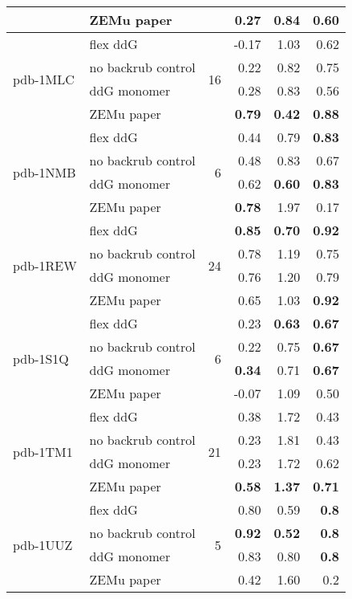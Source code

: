 \begin{longtable}{llrrrr}
 & ZEMu paper & & 0.27 & 0.84 & 0.60  \\
\hline
 \multirow{ 4}{*}{pdb-1MLC} & flex ddG & \multirow{ 4}{*}{16} & -0.17 & 1.03 & 0.62  \\
 & no backrub control & & 0.22 & 0.82 & 0.75  \\
 & ddG monomer & & 0.28 & 0.83 & 0.56  \\
 & ZEMu paper & & \textbf{0.79} & \textbf{0.42} & \textbf{0.88}  \\
\hline
 \multirow{ 4}{*}{pdb-1NMB} & flex ddG & \multirow{ 4}{*}{6} & 0.44 & 0.79 & \textbf{0.83}  \\
 & no backrub control & & 0.48 & 0.83 & 0.67  \\
 & ddG monomer & & 0.62 & \textbf{0.60} & \textbf{0.83}  \\
 & ZEMu paper & & \textbf{0.78} & 1.97 & 0.17  \\
\hline
 \multirow{ 4}{*}{pdb-1REW} & flex ddG & \multirow{ 4}{*}{24} & \textbf{0.85} & \textbf{0.70} & \textbf{0.92}  \\
 & no backrub control & & 0.78 & 1.19 & 0.75  \\
 & ddG monomer & & 0.76 & 1.20 & 0.79  \\
 & ZEMu paper & & 0.65 & 1.03 & \textbf{0.92}  \\
\hline
 \multirow{ 4}{*}{pdb-1S1Q} & flex ddG & \multirow{ 4}{*}{6} & 0.23 & \textbf{0.63} & \textbf{0.67}  \\
 & no backrub control & & 0.22 & 0.75 & \textbf{0.67}  \\
 & ddG monomer & & \textbf{0.34} & 0.71 & \textbf{0.67}  \\
 & ZEMu paper & & -0.07 & 1.09 & 0.50  \\
\hline
 \multirow{ 4}{*}{pdb-1TM1} & flex ddG & \multirow{ 4}{*}{21} & 0.38 & 1.72 & 0.43  \\
 & no backrub control & & 0.23 & 1.81 & 0.43  \\
 & ddG monomer & & 0.23 & 1.72 & 0.62  \\
 & ZEMu paper & & \textbf{0.58} & \textbf{1.37} & \textbf{0.71}  \\
\hline
 \multirow{ 4}{*}{pdb-1UUZ} & flex ddG & \multirow{ 4}{*}{5} & 0.80 & 0.59 & \textbf{0.8}  \\
 & no backrub control & & \textbf{0.92} & \textbf{0.52} & \textbf{0.8}  \\
 & ddG monomer & & 0.83 & 0.80 & \textbf{0.8}  \\
 & ZEMu paper & & 0.42 & 1.60 & 0.2  \\

\end{longtable}
